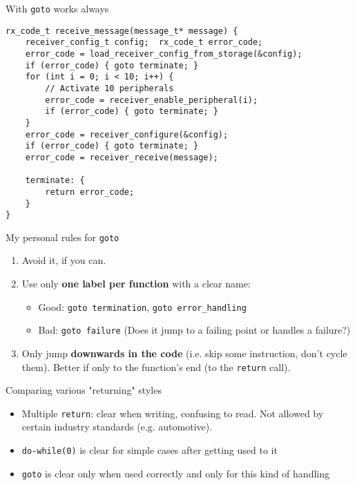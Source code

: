 \documentclass[aspectratio=169,14pt]{beamer}
\begin{document}
\begin{frame}[fragile]{With \texttt{goto} works always}
\begin{lstlisting}[style=cstyle]
rx_code_t receive_message(message_t* message) {
    receiver_config_t config;  rx_code_t error_code;
    error_code = load_receiver_config_from_storage(&config);
    if (error_code) { goto terminate; }
    for (int i = 0; i < 10; i++) {
        // Activate 10 peripherals
        error_code = receiver_enable_peripheral(i);
        if (error_code) { goto terminate; }
    }
    error_code = receiver_configure(&config);
    if (error_code) { goto terminate; }
    error_code = receiver_receive(message);
    
    terminate: {
        return error_code;
    }
}
\end{lstlisting}
\end{frame}



\begin{frame}{My personal rules for \texttt{goto}}
\begin{enumerate}
    \item Avoid it, if you can.
    \item Use only \textbf{one label per function} with a clear name:\\
        \begin{itemize}
            \item Good: \texttt{goto termination}, \texttt{goto error\_handling}
            \item Bad: \texttt{goto failure}  (Does it jump to a failing point or handles a failure?)
        \end{itemize}
    \item Only jump \textbf{downwards in the code} (i.e. skip some instruction, don’t cycle them). Better if only to the function's end (to the \texttt{return} call).
\end{enumerate}
\end{frame}



\begin{frame}{Comparing various "returning" styles}
\begin{itemize}
    \item Multiple \texttt{return}: clear when writing, confusing to read. Not allowed by certain industry standards (e.g. automotive).
    \item \texttt{do-while(0)} is clear for simple cases after getting used to it
    \item \texttt{goto} is clear only when used correctly and only for this kind of handling
\end{itemize}
\end{frame}
\end{document}
